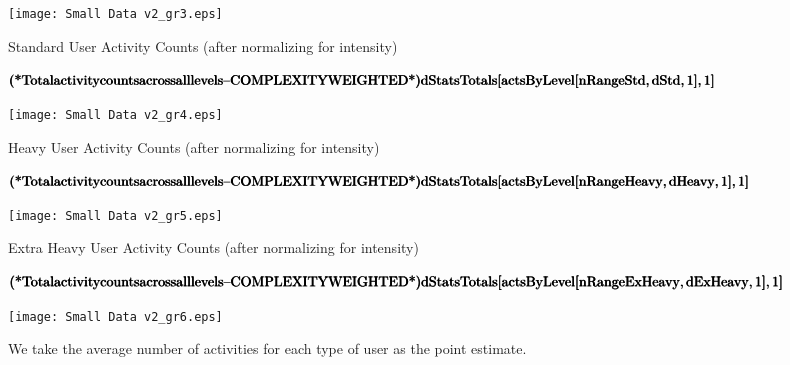 \documentclass{article}
\begin{document}
\texttt{[image: Small Data v2\_gr3.eps]}

Standard User Activity Counts (after normalizing for intensity)

\begin{doublespace}
\noindent\(\pmb{\text{(*} \text{Total} \text{activity} \text{counts} \text{across} \text{all} \text{levels} \text{--} \text{COMPLEXITY} \text{WEIGHTED}
\text{*)}}\\
\pmb{\text{dStatsTotals}[\text{actsByLevel}[\text{nRangeStd}, \text{dStd}, 1],1]}\)
\end{doublespace}

\texttt{[image: Small Data v2\_gr4.eps]}

Heavy User Activity Counts (after normalizing for intensity)

\begin{doublespace}
\noindent\(\pmb{\text{(*} \text{Total} \text{activity} \text{counts} \text{across} \text{all} \text{levels} \text{--} \text{COMPLEXITY} \text{WEIGHTED}
\text{*)}}\\
\pmb{\text{dStatsTotals}[\text{actsByLevel}[\text{nRangeHeavy}, \text{dHeavy}, 1],1]}\)
\end{doublespace}

\texttt{[image: Small Data v2\_gr5.eps]}

Extra Heavy User Activity Counts (after normalizing for intensity)

\begin{doublespace}
\noindent\(\pmb{\text{(*} \text{Total} \text{activity} \text{counts} \text{across} \text{all} \text{levels} \text{--} \text{COMPLEXITY} \text{WEIGHTED}
\text{*)}}\\
\pmb{\text{dStatsTotals}[\text{actsByLevel}[\text{nRangeExHeavy}, \text{dExHeavy}, 1],1]}\)
\end{doublespace}

\texttt{[image: Small Data v2\_gr6.eps]}

We take the average number of activities for each type of user as the point estimate.
\end{document}
